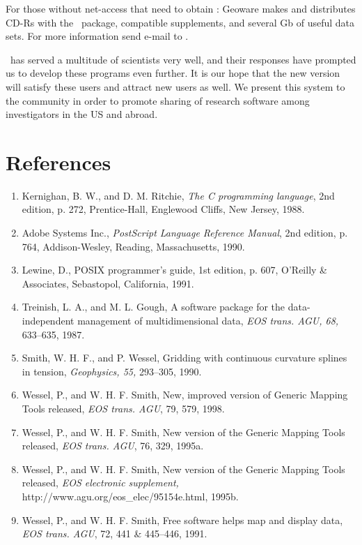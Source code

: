 For those without net-access that need to obtain \GMT: Geoware
makes and distributes CD-Rs with the \GMT\ package, compatible supplements, and
several Gb of useful data sets.  For more information send e-mail to
. 

\GMT\ has served a multitude of scientists very well, and their responses
have prompted us to develop these programs even further.  It is our
hope that the new version will satisfy these users and attract new
users as well.  We present this system to the community in order to
promote sharing of research software among investigators in the US
and abroad. 

\section*{References}

\begin{enumerate}
\item Kernighan, B. W., and D. M. Ritchie, {\it The C programming language},
2nd edition, p. 272, Prentice-Hall, Englewood Cliffs, New Jersey, 1988.

\item Adobe Systems Inc., {\it PostScript Language Reference Manual},
2nd edition, p. 764, Addison-Wesley, Reading, Massachusetts, 1990.

\item Lewine, D., POSIX programmer's guide, 1st edition, p. 607, O'Reilly
\& Associates, Sebastopol, California, 1991. 

\item Treinish, L. A., and M. L. Gough, A software package for the
data-independent management of multidimensional data,
{\it EOS trans. AGU, 68, }633--635, 1987.

\item Smith, W. H. F., and P. Wessel, Gridding with continuous curvature
splines in tension, {\it Geophysics, 55, }293--305, 1990. 

\item Wessel, P., and W. H. F. Smith, New, improved version of Generic
Mapping Tools released, {\it EOS trans. AGU}, 79, 579, 1998. 

\item Wessel, P., and W. H. F. Smith, New version of the Generic
Mapping Tools released, {\it EOS trans. AGU}, 76, 329, 1995a. 

\item Wessel, P., and W. H. F. Smith, New version of the Generic
Mapping Tools released, {\it EOS electronic supplement, }
http://www.agu.org/eos\_elec/95154e.html, 1995b. 

\item Wessel, P., and W. H. F. Smith, Free software helps map and
display data, {\it EOS trans. AGU}, 72, 441 \& 445--446, 1991. 

\end{enumerate}
